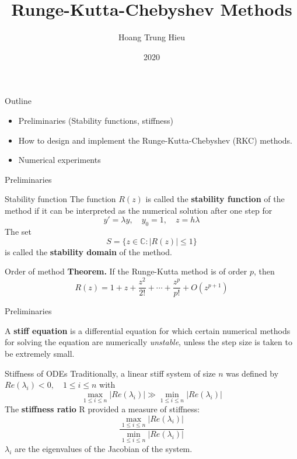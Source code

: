 \documentclass{beamer}
\title[Runge-Kutta-Chebyshev Methods]{Runge-Kutta-Chebyshev Methods}
\author{Hoang Trung Hieu}
\date{2020}
\begin{document}
\maketitle
\begin{frame}{Outline}
	
	\begin{itemize}
		\item  Preliminaries (Stability functions, stiffness)
		\item How to design and implement the Runge-Kutta-Chebyshev (RKC) methods.
		\item Numerical experiments 
	\end{itemize}
\end{frame}

\begin{frame}{Preliminaries}
	\begin{block}{Stability function}
			The function $R(z)$ is called the \textbf{stability function} of the method if it can be interpreted as the numerical solution after one step for $$y'=\lambda y ,\quad y_0=1, \quad z=h \lambda$$
			The set $$S=\{z \in \mathbb{C}: |R(z)| \le 1\}$$ is called the \textbf{stability domain} of the method.			
	\end{block}

 \begin{block}{Order of method}
 \textbf{Theorem.} If the Runge-Kutta method is of order $p$, then $$R(z)=1+z+\frac{z^2}{2 !} +\cdots +\frac{z^p}{p !} +O(z^{p+1})$$
 \end{block}
\end{frame}


\begin{frame}{Preliminaries} 
 \begin{block}{}
 A \textbf{stiff equation} is a differential equation for which certain numerical methods for solving the equation are numerically \textit{unstable}, unless the step size is taken to be extremely small.
 \end{block}  
 \begin{block}{Stiffness of ODEs}
 	Traditionally, a linear stiff system of size $n$ was defined by $Re(\lambda_i) <0, \quad 1 \le i \le n$
 	with $$\max_{1 \le i \le n} |Re(\lambda_i)| 
 	\gg \min_{1 \le i \le n} |Re(\lambda_i)|  $$
 	The \textbf{stiffness ratio}  R provided a measure of stiffness:
 	$$\dfrac{\max_{1 \le i \le n} |Re(\lambda_i)| }{
 	\min_{1 \le i \le n} |Re(\lambda_i)|}$$
  $\lambda_i$ are the eigenvalues of the Jacobian of the system.
  \end{block} 	
 
\end{frame}
\end{document}
